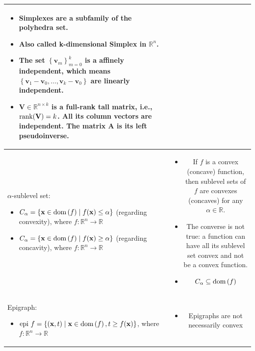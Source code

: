 \documentclass{article}
\newcommand{\dom}[1]{\ensuremath{\textnormal{dom}\left(#1\right)}} %
\begin{document}
\begin{xltabular}{\textwidth}{|A|C|}
\begin{itemize}[leftmargin=*]
    \item Simplexes are a subfamily of the polyhedra set.
    \item Also called k-dimensional Simplex in \(\mathbb{R}^{n}\).
    \item The set \(\left\{ \mathbf{v}_m \right\}_{m=0}^{k}\) is a affinely independent, which means \(\left\{ \mathbf{v}_1-\mathbf{v}_0, \dots, \mathbf{v}_k-\mathbf{v}_0 \right\}\) are linearly independent.
    \item \(\mathbf{V} \in \mathbb{R}^{n\times k}\) is a full-rank tall matrix, i.e., \(\textnormal{rank}(\mathbf{V}) = k\). All its column vectors are independent. The matrix \(\mathbf{A}\) is its left pseudoinverse.
\end{itemize}\\
\hline
\(\alpha\)-sublevel set:
\begin{itemize}[leftmargin=*]
    \item \(C_\alpha = \{\mathbf{x} \in \dom{f} \mid f(\mathbf{x}) \leq \alpha\}\) (regarding convexity), where \(f: \mathbb{R}^{n} \rightarrow \mathbb{R}\)
    \item \(C_\alpha = \{\mathbf{x} \in \dom{f} \mid f(\mathbf{x}) \geq \alpha\}\) (regarding concavity), where \(f: \mathbb{R}^{n} \rightarrow \mathbb{R}\)
\end{itemize} & \vspace{-3.5ex}
\begin{itemize}[leftmargin=*]
    \item If \(f\) is a convex (concave) function, then sublevel sets of \(f\) are convexes (concaves) for any \(\alpha\in \mathbb{R}\).
    \item The converse is not true: a function can have all its sublevel set convex and not be a convex function.
    \item \(C_\alpha \subseteq \dom{f}\)
\end{itemize}\\
\hline
Epigraph:
    \begin{itemize}[leftmargin=*]
        \item \(\textnormal{epi } f = \{(\mathbf{x}, t)\mid \mathbf{x} \in \dom{f}, t\geq f(\mathbf{x})\}\), where \(f: \mathbb{R}^{n} \rightarrow \mathbb{R}\)
    \end{itemize} & \vspace{-3.5ex}
    \begin{itemize}[leftmargin=*]
    \item Epigraphs are not necessarily convex

\end{itemize}
\end{xltabular}
\end{document}
